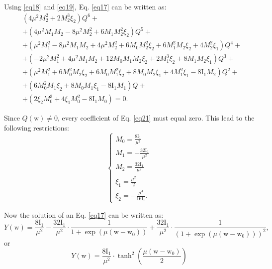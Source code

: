 \documentclass{article}
\begin{document}
    Using \ref{eq18} and \ref{eq19}, Eq. \ref{eq17} can be written as:
    \begin{equation}\label{eq21}
        \begin{split}
            &\left(4 \mu^{2} M_{2}^{2}+2 M_{2}^{3} \xi_{2}\right) Q^{6}+\\
            &+\left(4 \mu^{2} M_{1} M_{2}-8 \mu^{2} M_{2}^{2}+6 M_{1} M_{2}^{2} \xi_{2}\right) Q^{5}+\\
            &+\left(\mu^{2} M_{1}^{2}-8 \mu^{2} M_{1} M_{2}+4 \mu^{2} M_{2}^{2}+6 M_{0} M_{2}^{2} \xi_{2}+6 M_{1}^{2} M_{2} \xi_{2}+4 M_{2}^{2} \xi_{1}\right) Q^{4}+\\
            &+\left(-2 \mu^{2} M_{1}^{2}+4 \mu^{2} M_{1} M_{2}+12 M_{0} M_{1} M_{2} \xi_{2}+2 M_{1}^{3} \xi_{2}+8 M_{1} M_{2} \xi_{1}\right) Q^{3}+\\
            &+\left(\mu^{2} M_{1}^{2}+6 M_{0}^{2} M_{2} \xi_{2}+6 M_{0} M_{1}^{2} \xi_{2}+8 M_{0} M_{2} \xi_{1}+4 M_{1}^{2} \xi_{1}-8 \mathrm{I}_{1} M_{2}\right) Q^{2}+\\
            &+\left(6 M_{0}^{2} M_{1} \xi_{2}+8 M_{0} M_{1} \xi_{1}-8 \mathrm{I}_{1} M_{1}\right) Q+\\
            &+\left(2 \xi_{2} M_{0}^{3}+4 \xi_{1} M_{0}^{2}-8 \mathrm{I}_{1} M_{0}\right)=0.
        \end{split}
    \end{equation}

    Since \(Q(\mathrm{w}) \neq 0\), every coefficient of Eq. \ref{eq21} must equal zero. This lead to the following restrictions:
    \begin{equation} \label{eq22}
        \begin{cases}
            \displaystyle M_{0} = \frac{8 \mathrm{I}_{1}}{\mu^{2}}\\
            \displaystyle M_{1} = -\frac{32 \mathrm{I}_{1}}{\mu^{2}}\\
            \displaystyle M_{2} = \frac{32 \mathrm{I}_{1}}{\mu^{2}}\\
            \displaystyle \xi_{1} = \frac{\mu^{2}}{2}\\
            \displaystyle \xi_{2} = -\frac{\mu^{4}}{16 \mathrm{I}_{1}}.
        \end{cases}
    \end{equation}

    Now the solution of an Eq. \ref{eq17} can be written as:
    \begin{equation} \label{eq23}
        Y(\mathrm{w}) = \frac{8 \mathrm{I}_{1}}{\mu^{2}} - \frac{32 \mathrm{I}_{1}}{\mu^{2}} \cdot \frac{1}{1 + \exp\left(\mu(\mathrm{w}-\mathrm{w}_{0})\right)} + \frac{32 \mathrm{I}_{1}}{\mu^{2}} \cdot \frac{1}{\left(1 + \exp\left(\mu(\mathrm{w}-\mathrm{w}_{0})\right)\right)^{2}},
    \end{equation}
    or
    \begin{equation} \label{eq24}
        Y(\mathrm{w}) = \frac{8\mathrm{I}_{1}}{\mu^2} \cdot \tanh^{2}\left(\frac{\mu\left(\mathrm{w}-\mathrm{w}_{0}\right)}{2}\right)
    \end{equation}
\end{document}
